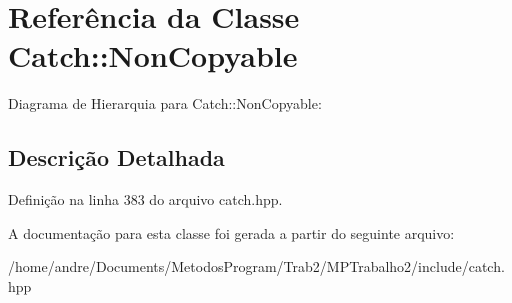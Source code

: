 \hypertarget{classCatch_1_1NonCopyable}{}\section{Referência da Classe Catch\+:\+:Non\+Copyable}
\label{classCatch_1_1NonCopyable}


Diagrama de Hierarquia para Catch\+:\+:Non\+Copyable\+:


\subsection{Descrição Detalhada}


Definição na linha 383 do arquivo catch.\+hpp.



A documentação para esta classe foi gerada a partir do seguinte arquivo\+:\begin{DoxyCompactItemize}
\item 
/home/andre/\+Documents/\+Metodos\+Program/\+Trab2/\+M\+P\+Trabalho2/include/catch.\+hpp\end{DoxyCompactItemize}
